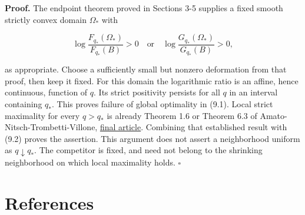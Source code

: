 \documentclass[11pt]{article}
\begin{document}
\textbf{Proof.} The endpoint theorem proved in Sections 3-5 supplies a
fixed smooth strictly convex domain \(\Omega_*\) with

\[
\log\frac{F_{q_*}(\Omega_*)}{F_{q_*}(B)}>0
\quad\text{or}\quad
\log\frac{G_{q_*}(\Omega_*)}{G_{q_*}(B)}>0,
\tag{9.2}
\]

as appropriate. Choose a sufficiently small but nonzero deformation from
that proof, then keep it fixed. For this domain the logarithmic ratio is
an affine, hence continuous, function of \(q\). Its strict positivity
persists for all \(q\) in an interval containing \(q_*\). This proves
failure of global optimality in (9.1). Local strict maximality for every
\(q>q_*\) is already Theorem 1.6 or Theorem 6.3 of
Amato-Nitsch-Trombetti-Villone,
\href{https://doi.org/10.1007/s11118-026-10328-2}{final article}.
Combining that established result with (9.2) proves the assertion. This
argument does not assert a neighborhood uniform as \(q\downarrow q_*\).
The competitor is fixed, and need not belong to the shrinking
neighborhood on which local maximality holds. \(\square\)

\raggedright{}\section{References}\label{references}
\end{document}
